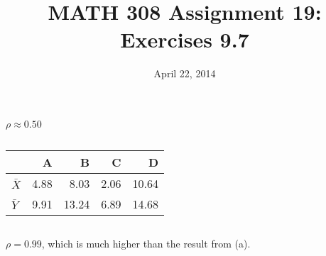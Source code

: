 \documentclass[twocolumn]{article}
\title{MATH 308 Assignment 19:\\Exercises 9.7}
\date{April 22, 2014}
\begin{document}
\maketitle

\subsection{}
$\rho\approx0.50$
\subsection{}
\begin{table}[h]\centering
\begin{tabular}{@{}lrrrr@{}}
\toprule
  & A    & B     & C    & D     \\ \midrule
$\bar X$ & 4.88 & 8.03  & 2.06 & 10.64 \\
$\bar Y$ & 9.91 & 13.24 & 6.89 & 14.68 \\ \bottomrule
\end{tabular}
\end{table}
\subsection{}
$\rho=0.99$, which is much higher than the result from (a).



\end{document}
